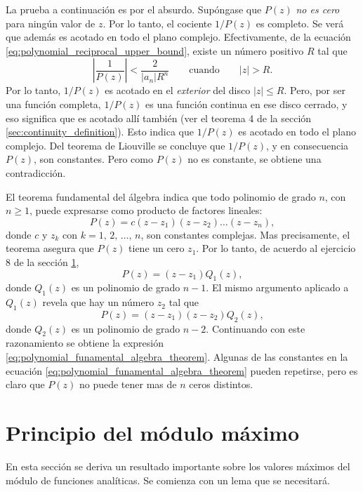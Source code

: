\documentclass[a4paper]{report}
\begin{document}
La prueba a continuación es por el absurdo. Supóngase que \(P(z)\) \emph{no es cero} para ningún valor de \(z\). Por lo tanto, el cociente \(1/P(z)\) es completo. Se verá que además es acotado en todo el plano complejo. Efectivamente, de la ecuación \ref{eq:polynomial_reciprocal_upper_bound}, existe un número positivo \(R\) tal que 
\[
 \left|\frac{1}{P(z)}\right|<\frac{2}{|a_n|R^n}
 \qquad\textrm{cuando}\qquad 
 |z|>R.
\]
Por lo tanto, \(1/P(z)\) es acotado en el \emph{exterior} del disco \(|z|\leq R\). Pero, por ser una función completa, \(1/P(z)\) es una función continua en ese disco cerrado, y eso significa que es acotado allí también (ver el teorema 4 de la sección \ref{sec:continuity_definition}). Esto indica que \(1/P(z)\) es acotado en todo el plano complejo. Del teorema de Liouville se concluye que \(1/P(z)\), y en consecuencia \(P(z)\), son constantes. Pero como \(P(z)\) no es constante, se obtiene una contradicción.

El teorema fundamental del álgebra indica que todo polinomio de grado \(n\), con \(n\geq1\), puede expresarse como producto de factores lineales:
\begin{equation}\label{eq:polynomial_funamental_algebra_theorem}
  P(z)=c(z-z_1)(z-z_2)\dots(z-z_n),
\end{equation}
donde \(c\) y \(z_k\) con \(k=1,\,2,\,\dots,\,n\), son constantes complejas. Mas precisamente, el teorema asegura que \(P(z)\) tiene un cero \(z_1\). Por lo tanto, de acuerdo al ejercicio 8 de la sección \ref{sec:maximum_modulus_principle},
\[
 P(z)=(z-z_1)Q_1(z),
\]
donde \(Q_1(z)\) es un polinomio de grado \(n-1\). El mismo argumento aplicado a \(Q_1(z)\) revela que hay un número \(z_2\) tal que 
\[
 P(z)=(z-z_1)(z-z_2)Q_2(z),
\]
donde \(Q_2(z)\) es un polinomio de grado \(n-2\). Continuando con este razonamiento se obtiene la expresión \ref{eq:polynomial_funamental_algebra_theorem}. Algunas de las constantes en la ecuación \ref{eq:polynomial_funamental_algebra_theorem} pueden repetirse, pero es claro que \(P(z)\) no puede tener mas de \(n\) ceros distintos. 

\section{Principio del módulo máximo}\label{sec:maximum_modulus_principle}

En esta sección se deriva un resultado importante sobre los valores máximos del módulo de funciones analíticas. Se comienza con un lema que se necesitará.
\end{document}
